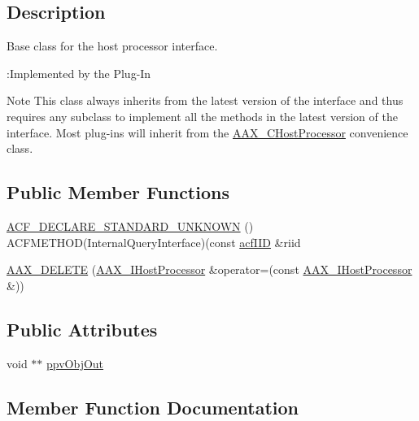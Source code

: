\subsection{Description}
Base class for the host processor interface. 

\begin{DoxyRefDesc}{\+:\+Implemented by the Plug-\/\+In}
\item[\mbox{\hyperlink{a00791__aax_plugin_implementation000004}{\+:\+Implemented by the Plug-\/\+In}}]\end{DoxyRefDesc}


\begin{DoxyNote}{Note}
This class always inherits from the latest version of the interface and thus requires any subclass to implement all the methods in the latest version of the interface. Most plug-\/ins will inherit from the \mbox{\hyperlink{a01485}{A\+A\+X\+\_\+\+C\+Host\+Processor}} convenience class. 
\end{DoxyNote}
\subsection*{Public Member Functions}
\begin{DoxyCompactItemize}
\item 
\mbox{\hyperlink{a01833_aad3a3b1dcb09094588b31c2508c64484}{A\+C\+F\+\_\+\+D\+E\+C\+L\+A\+R\+E\+\_\+\+S\+T\+A\+N\+D\+A\+R\+D\+\_\+\+U\+N\+K\+N\+O\+WN}} () A\+C\+F\+M\+E\+T\+H\+OD(Internal\+Query\+Interface)(const \mbox{\hyperlink{a00269_a59df0b41744eee7a066787aaedf97f67}{acf\+I\+ID}} \&riid
\item 
\mbox{\hyperlink{a01833_a49bf62b79b57465c39238b54fc836753}{A\+A\+X\+\_\+\+D\+E\+L\+E\+TE}} (\mbox{\hyperlink{a01833}{A\+A\+X\+\_\+\+I\+Host\+Processor}} \&operator=(const \mbox{\hyperlink{a01833}{A\+A\+X\+\_\+\+I\+Host\+Processor}} \&))
\end{DoxyCompactItemize}
\subsection*{Public Attributes}
\begin{DoxyCompactItemize}
\item 
void $\ast$$\ast$ \mbox{\hyperlink{a01833_a780e10c6159c1af2e1a62f990131ca78}{ppv\+Obj\+Out}}
\end{DoxyCompactItemize}


\subsection{Member Function Documentation}
\mbox{\label{a01833_aad3a3b1dcb09094588b31c2508c64484}} 
